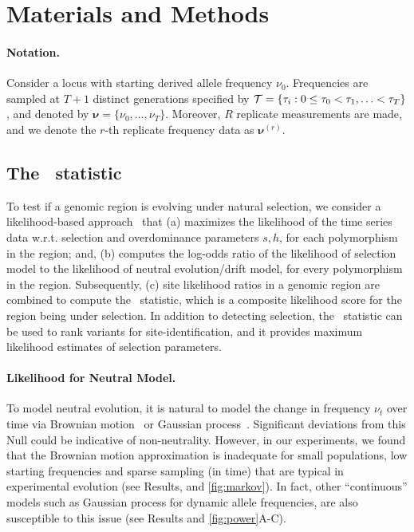 \section{Materials and Methods}
\label{sec:method}
\paragraph{Notation.} 
Consider a locus with starting derived allele frequency
$\nu_0$. Frequencies are sampled at $T+1$ distinct generations specified
by ${\cal T}= \{\tau_i: 0\le \tau_0<\tau_1,\ldots< \tau_T\}$, and
denoted by $\bm{\nu}=\{\nu_0,\ldots,\nu_T\}$. Moreover, $R$ replicate
measurements are made, and we denote the $r$-th replicate frequency
data as $\bm{\nu}^{(r)}$.

\subsection{The \comale\  statistic}
To test if a genomic region is evolving under natural selection, we
consider a likelihood-based
approach~\cite{vitti2013detecting,nielsen2005genomic,topa2015gaussian,Terhorst2015Multi}
that (a) maximizes the likelihood of the time series data
w.r.t. selection and overdominance parameters $s,h$, for each
polymorphism in the region; and, (b) computes the log-odds ratio of
the likelihood of selection model to the likelihood of neutral
evolution/drift model, for every polymorphism in the
region. Subsequently, (c) site likelihood ratios in a genomic region
are combined to compute the \comale\ statistic, which is a composite
likelihood score for the region being under selection. In addition to
detecting selection, the \comale\ statistic can be used to rank
variants for site-identification, and it provides maximum likelihood estimates 
of selection parameters.

\paragraph{Likelihood for Neutral Model.}
To model neutral evolution, it is natural to model the change in
frequency $\nu_t$ over time via Brownian
motion~\cite{feder2014Identifying} or Gaussian
process~\cite{topa2015gaussian,Terhorst2015Multi}. Significant
deviations from this Null could be indicative of
non-neutrality. However, in our experiments, we found that the
Brownian motion approximation is inadequate for small populations, low
starting frequencies and sparse sampling (in time) that are typical in
experimental evolution (see Results, and 
\ref{fig:markov}). In
fact, other ``continuous'' models such as Gaussian process for dynamic
allele frequencies, are also susceptible to this issue (see Results
and \ref{fig:power}A-C).


